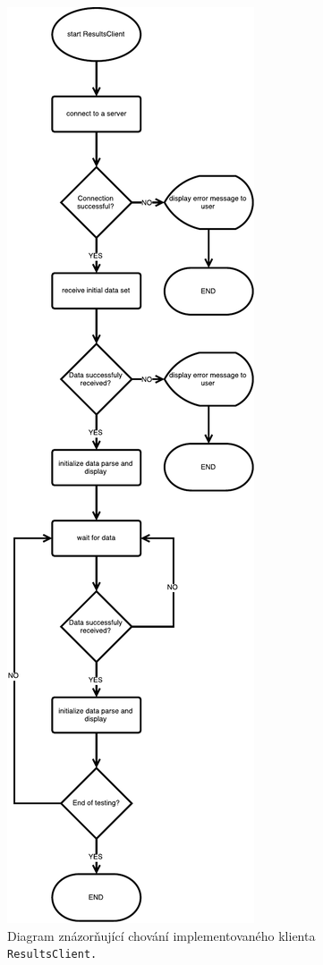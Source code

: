       \begin{figure}
	  \includegraphics[width=\textwidth, height=0.95\textheight, keepaspectratio, center]{obrazky-figures/trview_resultsclient_flowchart.pdf}
	  \caption{Diagram znázorňující chování implementovaného klienta \texttt{ResultsClient.}}
	  \label{fig:resultsclient_flowchart}
	\end{figure}
      
